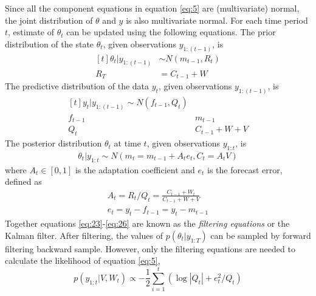 \documentclass{article}
\begin{document}
Since all the component equations in equation \eqref{eq:5} are (multivariate) normal, the joint distribution of $\theta$ and $y$ is also multivariate normal.
For each time period $t$, estimate of $\theta_{t}$ can be updated using the following equations.
The prior distribution of the state $\theta_{t}$, given observations $y_{1:(t-1)}$, is
\begin{equation}
  \label{eq:23}
  \begin{aligned}[t]
    \theta_{t} | y_{1:(t-1)} & \sim N(m_{t-1}, R_{t}) \\
    R_{T} & = C_{t - 1} + W
  \end{aligned}
\end{equation}
The predictive distribution of the data $y_{t}$, given observations $y_{1:(t-1)}$, is
\begin{equation}
  \label{eq:25}
  \begin{aligned}[t]
    y_{t} | y_{1:(t-1)}  \sim N(f_{t-1}, Q_{t}) \\
    f_{t-1} & m_{t-1} \\
    Q_{t} & C_{t - 1} + W + V
  \end{aligned}
\end{equation}
The posterior distribution $\theta_{t}$ at time $t$, given observations $y_{1:t}$, is
\begin{equation}
  \label{eq:26}
  \begin{aligned}
    \theta_{t} | y_{1:t} \sim N(m_{t} = m_{t-1} + A_{t} e_{t}, C_{t} = A_{t} V)    
  \end{aligned}
\end{equation}
where $A_{t} \in [0, 1]$ is the adaptation coefficient and $e_{t}$ is the forecast error, defined as
\begin{align}
  \label{eq:30}
  A_{t} = R_{t} / Q_{t} = \frac{C_{t-1} + W_{t}}{C_{t-1} + W + V} \\
  e_{t} = y_{t} - f_{t-1} = y_{t} - m_{t-1}
\end{align}
Together equations \eqref{eq:23}-\eqref{eq:26} are known as the \textit{filtering equations} or the Kalman filter.
After filtering, the values of $p(\theta_{t} | y_{1:T})$ can be sampled by forward filtering backward sample.
However, only the filtering equations are needed to calculate the likelihood of equation \eqref{eq:5},
\begin{equation}
  \label{eq:27}
  p(y_{1:t} | V, W_{t}) \propto -\frac{1}{2} \sum_{i = 1}^{t}  \left( \log | Q_{t} |  + e_{t}^{2} / Q_{t} \right)
\end{equation}
\end{document}
